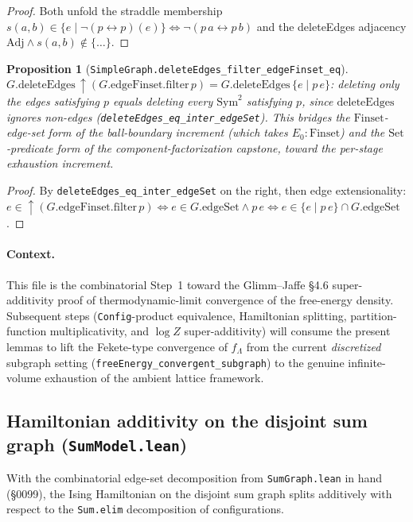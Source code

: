 \documentclass[a4paper,11pt]{article}
\newtheorem{proposition}[theorem]{Proposition}
\begin{document}
\begin{proof}
Both unfold the straddle membership $s(a,b)\in\{e\mid\neg(p\!\leftrightarrow\!p)(e)\}
\Leftrightarrow \neg(p\,a\leftrightarrow p\,b)$ and the deleteEdges adjacency
$\mathrm{Adj}\wedge s(a,b)\notin\{\dots\}$.
\end{proof}

\begin{proposition}[\texttt{SimpleGraph.deleteEdges\_filter\_edgeFinset\_eq}]
$G.\mathrm{deleteEdges}\,\uparrow(G.\mathrm{edgeFinset.filter}\,p)
  = G.\mathrm{deleteEdges}\,\{e\mid p\,e\}$: deleting only the \emph{edges}
satisfying $p$ equals deleting every $\mathrm{Sym}^2$ satisfying $p$, since
$\mathrm{deleteEdges}$ ignores non-edges (\texttt{deleteEdges\_eq\_inter\_edgeSet}).
This bridges the $\mathrm{Finset}$-edge-set form of the ball-boundary increment
(which takes $E_0:\mathrm{Finset}$) and the $\mathrm{Set}$-predicate form of the
component-factorization capstone, toward the per-stage exhaustion increment.
\end{proposition}

\begin{proof}
By \texttt{deleteEdges\_eq\_inter\_edgeSet} on the right, then edge extensionality:
$e\in\uparrow(G.\mathrm{edgeFinset.filter}\,p)\Leftrightarrow e\in G.\mathrm{edgeSet}\wedge p\,e
\Leftrightarrow e\in\{e\mid p\,e\}\cap G.\mathrm{edgeSet}$.
\end{proof}

\paragraph{Context.} This file is the combinatorial Step~1 toward the
Glimm--Jaffe \S 4.6 super-additivity proof of thermodynamic-limit
convergence of the free-energy density. Subsequent steps
(\texttt{Config}-product equivalence, Hamiltonian splitting,
partition-function multiplicativity, and $\log Z$ super-additivity)
will consume the present lemmas to lift the Fekete-type convergence
of $f_{\Lambda}$ from the current \emph{discretized} subgraph
setting (\texttt{freeEnergy\_convergent\_subgraph}) to the genuine
infinite-volume exhaustion of the ambient lattice framework.

\subsection{Hamiltonian additivity on the disjoint sum graph (\texttt{SumModel.lean})}

With the combinatorial edge-set decomposition from \texttt{SumGraph.lean}
in hand (\S 0099), the Ising Hamiltonian on the disjoint sum graph
splits additively with respect to the \texttt{Sum.elim} decomposition
of configurations.
\end{document}
